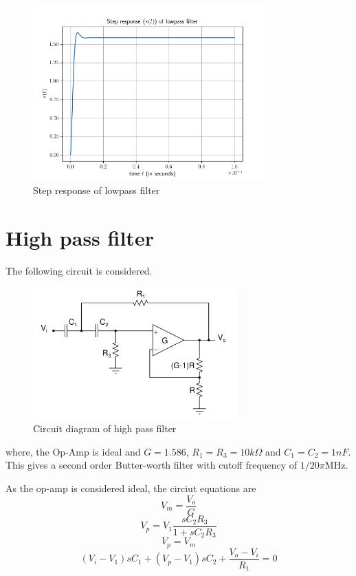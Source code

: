 \documentclass[12pt, a4paper]{article}
\begin{document}
\begin{figure}[H]
\centering
\includegraphics[width=0.8\textwidth]{q1.png}
\caption{Step response of lowpass filter}
\end{figure}

\section{High pass filter}

The following circuit is considered.

\begin{figure}[H]
\centering
\includegraphics[width=0.7\textwidth]{highpass.png}
\caption{Circuit diagram of high pass filter}
\end{figure}

where, the Op-Amp is ideal and $G = 1.586$, $R_1 = R_3  = 10k\Omega$ and $C_1 = C_2 = 1nF$. This gives a second order Butter-worth filter with cutoff frequency of $1/20\pi$MHz.

As the op-amp is considered ideal, the circiut equations are
\begin{equation}
V_m = \frac{V_o}{G}
\end{equation}
\begin{equation}
V_p = V_1\frac{sC_2R_3}{1 + sC_2 R_3}
\end{equation}
\begin{equation}
V_p = V_m 
\end{equation}
\begin{equation}
(V_i - V_1)sC_1 + (V_p - V_1)sC_2 + \frac{V_o - V_i}{R_1} = 0
\end{equation}
\end{document}

